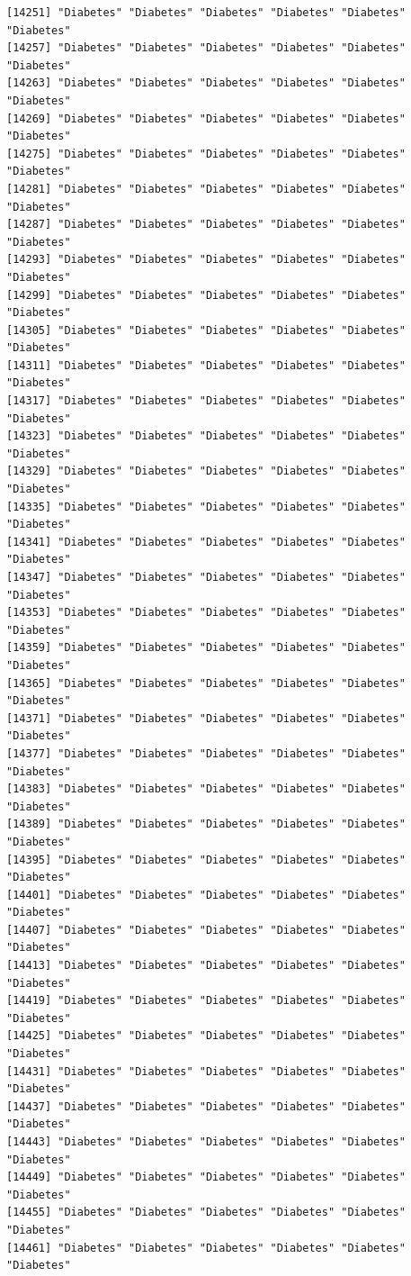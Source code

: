 \documentclass[
  letterpaper,
  DIV=11,
  numbers=noendperiod]{scrartcl}
\begin{document}
\begin{verbatim}
[14251] "Diabetes" "Diabetes" "Diabetes" "Diabetes" "Diabetes" "Diabetes"
[14257] "Diabetes" "Diabetes" "Diabetes" "Diabetes" "Diabetes" "Diabetes"
[14263] "Diabetes" "Diabetes" "Diabetes" "Diabetes" "Diabetes" "Diabetes"
[14269] "Diabetes" "Diabetes" "Diabetes" "Diabetes" "Diabetes" "Diabetes"
[14275] "Diabetes" "Diabetes" "Diabetes" "Diabetes" "Diabetes" "Diabetes"
[14281] "Diabetes" "Diabetes" "Diabetes" "Diabetes" "Diabetes" "Diabetes"
[14287] "Diabetes" "Diabetes" "Diabetes" "Diabetes" "Diabetes" "Diabetes"
[14293] "Diabetes" "Diabetes" "Diabetes" "Diabetes" "Diabetes" "Diabetes"
[14299] "Diabetes" "Diabetes" "Diabetes" "Diabetes" "Diabetes" "Diabetes"
[14305] "Diabetes" "Diabetes" "Diabetes" "Diabetes" "Diabetes" "Diabetes"
[14311] "Diabetes" "Diabetes" "Diabetes" "Diabetes" "Diabetes" "Diabetes"
[14317] "Diabetes" "Diabetes" "Diabetes" "Diabetes" "Diabetes" "Diabetes"
[14323] "Diabetes" "Diabetes" "Diabetes" "Diabetes" "Diabetes" "Diabetes"
[14329] "Diabetes" "Diabetes" "Diabetes" "Diabetes" "Diabetes" "Diabetes"
[14335] "Diabetes" "Diabetes" "Diabetes" "Diabetes" "Diabetes" "Diabetes"
[14341] "Diabetes" "Diabetes" "Diabetes" "Diabetes" "Diabetes" "Diabetes"
[14347] "Diabetes" "Diabetes" "Diabetes" "Diabetes" "Diabetes" "Diabetes"
[14353] "Diabetes" "Diabetes" "Diabetes" "Diabetes" "Diabetes" "Diabetes"
[14359] "Diabetes" "Diabetes" "Diabetes" "Diabetes" "Diabetes" "Diabetes"
[14365] "Diabetes" "Diabetes" "Diabetes" "Diabetes" "Diabetes" "Diabetes"
[14371] "Diabetes" "Diabetes" "Diabetes" "Diabetes" "Diabetes" "Diabetes"
[14377] "Diabetes" "Diabetes" "Diabetes" "Diabetes" "Diabetes" "Diabetes"
[14383] "Diabetes" "Diabetes" "Diabetes" "Diabetes" "Diabetes" "Diabetes"
[14389] "Diabetes" "Diabetes" "Diabetes" "Diabetes" "Diabetes" "Diabetes"
[14395] "Diabetes" "Diabetes" "Diabetes" "Diabetes" "Diabetes" "Diabetes"
[14401] "Diabetes" "Diabetes" "Diabetes" "Diabetes" "Diabetes" "Diabetes"
[14407] "Diabetes" "Diabetes" "Diabetes" "Diabetes" "Diabetes" "Diabetes"
[14413] "Diabetes" "Diabetes" "Diabetes" "Diabetes" "Diabetes" "Diabetes"
[14419] "Diabetes" "Diabetes" "Diabetes" "Diabetes" "Diabetes" "Diabetes"
[14425] "Diabetes" "Diabetes" "Diabetes" "Diabetes" "Diabetes" "Diabetes"
[14431] "Diabetes" "Diabetes" "Diabetes" "Diabetes" "Diabetes" "Diabetes"
[14437] "Diabetes" "Diabetes" "Diabetes" "Diabetes" "Diabetes" "Diabetes"
[14443] "Diabetes" "Diabetes" "Diabetes" "Diabetes" "Diabetes" "Diabetes"
[14449] "Diabetes" "Diabetes" "Diabetes" "Diabetes" "Diabetes" "Diabetes"
[14455] "Diabetes" "Diabetes" "Diabetes" "Diabetes" "Diabetes" "Diabetes"
[14461] "Diabetes" "Diabetes" "Diabetes" "Diabetes" "Diabetes" "Diabetes"

\end{verbatim}
\end{document}
